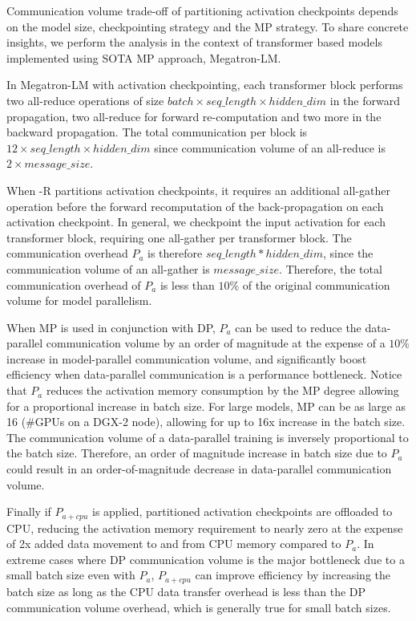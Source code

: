 Communication volume trade-off of partitioning activation checkpoints depends on the model size, checkpointing strategy and the MP strategy.  To share concrete insights, we perform the analysis in the context of transformer based models implemented using SOTA MP approach, Megatron-LM.

In Megatron-LM with activation checkpointing, each transformer block performs two all-reduce operations of size $batch \times seq\_length \times hidden\_dim$ in the forward propagation, two all-reduce for forward re-computation and two more in the backward propagation.  The total communication per block is $12 \times seq\_length \times hidden\_dim$ since communication volume of an all-reduce is $2 \times message\_size$. 

When \name-R partitions activation checkpoints, it requires an additional all-gather operation before the forward recomputation of the back-propagation on each activation checkpoint. In general, we checkpoint the input activation for each transformer block, requiring one all-gather per transformer block. The communication overhead $P_a$ is therefore $seq\_length * hidden\_dim$, since the communication volume of an all-gather is $message\_size$. Therefore, the total communication overhead of $P_a$ is less than $10\%$ of the original communication volume for model parallelism.

When MP is used in conjunction with DP, $P_a$ can be used to reduce the data-parallel communication volume by an order of magnitude at the expense of a $10\%$ increase in model-parallel communication volume, and significantly boost efficiency when data-parallel communication is a performance bottleneck. Notice that $P_a$ reduces the activation memory consumption by the MP degree allowing for a proportional increase in batch size. For large models, MP can be as large as 16 (\#GPUs on a DGX-2 node), allowing for up to 16x increase in the batch size. The communication volume of a data-parallel training is inversely proportional to the batch size. Therefore, an order of magnitude increase in batch size due to $P_a$ could result in an order-of-magnitude decrease in data-parallel communication volume. 

Finally if $P_{a+cpu}$ is applied, partitioned activation checkpoints are offloaded to CPU, reducing the activation memory requirement to nearly zero at the expense of 2x added data movement to and from CPU memory compared to $P_a$. In extreme cases where DP communication volume is the major bottleneck due to a small batch size even with $P_a$, $P_{a+cpu}$ can improve efficiency by increasing the batch size as long as the CPU data transfer overhead is less than the DP communication volume overhead, which is generally true for small batch sizes.  

